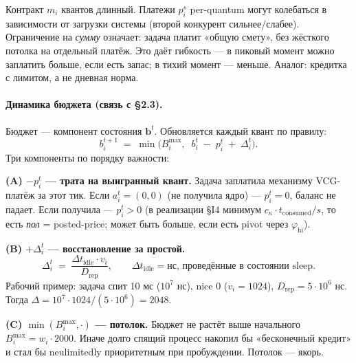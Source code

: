 \documentclass[11pt,a4paper]{article}
\begin{document}
\begin{why}
Контракт $m_i$ квантов длинный. Платежи $p_i^s$ per-quantum могут
колебаться в зависимости от загрузки системы (второй конкурент
сильнее/слабее). Ограничение на \emph{сумму} означает: задача
платит «общую смету», без жёсткого потолка на отдельный платёж.
Это даёт гибкость — в пиковый момент можно заплатить больше, если
есть запас; в тихий момент — меньше. Аналог: кредитка с лимитом,
а не дневная норма.
\end{why}

\paragraph{Динамика бюджета (связь с §2.3).}

Бюджет — компонент состояния $\mathbf{b}^t$. Обновляется каждый квант
по правилу:
\[
\boxed{\;b_i^{t+1} \;=\; \min\!\bigl(B_i^{\max},\;\; b_i^t \;-\; p_i^t \;+\; \Delta_i^t\bigr).\;}
\]
Три компоненты по порядку важности:

\textbf{(A) $-p_i^t$ — трата на выигранный квант.}
Задача заплатила механизму VCG-платёж за этот тик. Если
$a_i^t=(0,0)$ (не получила ядро) — $p_i^t=0$, баланс не падает. Если
получила — $p_i^t>0$ (в реализации §I4 минимум $c_\kappa\cdot
t_{\text{consumed}}/s$, то есть \emph{пол} = posted-price; может быть
больше, если есть pivot через $\varphi_{\text{hi}}$).

\textbf{(B) $+\Delta_i^t$ — восстановление за простой.}
\[
\Delta_i^t \;=\; \frac{\Delta t_{\text{idle}}\cdot v_i}{D_{\text{rep}}},\qquad
\Delta t_{\text{idle}} = \text{нс, проведённые в состоянии sleep}.
\]
Рабочий пример: задача спит 10 мс ($10^7$ нс), nice 0 ($v_i=1024$),
$D_{\text{rep}}=5\cdot 10^6$ нс.
Тогда $\Delta = 10^7\cdot 1024/(5\cdot 10^6) = 2048$.

\textbf{(C) $\min(B_i^{\max},\cdot)$ — потолок.}
Бюджет не растёт выше начального $B_i^{\max}=w_i\cdot 2000$.
Иначе долго спящий процесс накопил бы «бесконечный кредит» и стал
бы neulimitedly приоритетным при пробуждении. Потолок — якорь.
\end{document}
